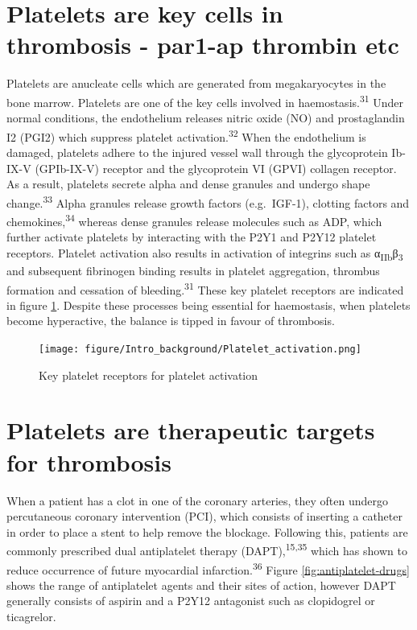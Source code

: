 \documentclass[11pt,twoside]{bristolthesis}
\begin{document}
\hypertarget{platelets-are-key-cells-in-thrombosis---par1-ap-thrombin-etc}{%
\section{Platelets are key cells in thrombosis - par1-ap thrombin etc}\label{platelets-are-key-cells-in-thrombosis---par1-ap-thrombin-etc}}

Platelets are anucleate cells which are generated from megakaryocytes in the bone marrow. Platelets are one of the key cells involved in haemostasis.\textsuperscript{31} Under normal conditions, the endothelium releases nitric oxide (NO) and prostaglandin I2 (PGI2) which suppress platelet activation.\textsuperscript{32} When the endothelium is damaged, platelets adhere to the injured vessel wall through the glycoprotein Ib-IX-V (GPIb-IX-V) receptor and the glycoprotein VI (GPVI) collagen receptor. As a result, platelets secrete alpha and dense granules and undergo shape change.\textsuperscript{33} Alpha granules release growth factors (e.g.~IGF-1), clotting factors and chemokines,\textsuperscript{34} whereas dense granules release molecules such as ADP, which further activate platelets by interacting with the P2Y1 and P2Y12 platelet receptors. Platelet activation also results in activation of integrins such as α\textsubscript{IIb}β\textsubscript{3} and subsequent fibrinogen binding results in platelet aggregation, thrombus formation and cessation of bleeding.\textsuperscript{31} These key platelet receptors are indicated in figure \ref{fig:platelet-activation}. Despite these processes being essential for haemostasis, when platelets become hyperactive, the balance is tipped in favour of thrombosis.
\begin{figure}
\centering
\texttt{[image: figure/Intro\_background/Platelet\_activation.png]}
\caption{\label{fig:platelet-activation}Key platelet receptors for platelet activation}
\end{figure}
\hypertarget{platelets-are-therapeutic-targets-for-thrombosis}{%
\section{Platelets are therapeutic targets for thrombosis}\label{platelets-are-therapeutic-targets-for-thrombosis}}

When a patient has a clot in one of the coronary arteries, they often undergo percutaneous coronary intervention (PCI), which consists of inserting a catheter in order to place a stent to help remove the blockage. Following this, patients are commonly prescribed dual antiplatelet therapy (DAPT),\textsuperscript{15,35} which has shown to reduce occurrence of future myocardial infarction.\textsuperscript{36} Figure \ref{fig:antiplatelet-drugs} shows the range of antiplatelet agents and their sites of action, however DAPT generally consists of aspirin and a P2Y12 antagonist such as clopidogrel or ticagrelor.
\end{document}
